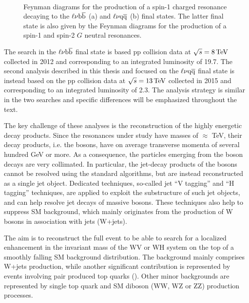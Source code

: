 \begin{figure}[!htb]
\centering
{}
\\
\caption{Feynman diagrams for the production of a spin-1 charged resonance \Wpr decaying to the $\ell\nu{\mathrm{b}\overline{\mathrm{b}}}$ (a) and $\ell\nu\mathrm{q}\overline{\mathrm{q}}$ (b) final states.
The latter final state is also given by the Feynman diagrams for the production of a spin-1 \Zpr and spin-2 $G$ neutral resonances.}
\label{fig:FDsignals}
\end{figure}

The search in the $\ell\nu{\mathrm{b}\overline{\mathrm{b}}}$ final state is based pp collision data at $\sqrt{s} = 8\,\text{Te\hspace{-.08em}V}$ collected in 2012 and corresponding to an integrated luminosity of 19.7\fbinv.
The second analysis described in this thesis and focused on the $\ell\nu\mathrm{q}\overline{\mathrm{q}}$ final state is instead based on the pp collision data at $\sqrt{s} = 13\,\text{Te\hspace{-.08em}V}$ collected in 2015 and corresponding to an integrated luminosity of 2.3\fbinv.
The analysis strategy is similar in the two searches and specific differences will be emphasized throughout the text.

The key challenge of these analyses is the reconstruction of the highly energetic decay products.
Since the resonances under study have masses of $\approx$ TeV, their decay products, i.e. the bosons,
have on average transverse momenta of several hundred GeV or more.
As a consequence, the particles emerging from the boson decays are very collimated.
In particular, the jet-decay products of the bosons cannot be resolved using the standard algorithms,
but are instead reconstructed as a single jet object. Dedicated techniques, so-called jet ``V tagging'' and ``H tagging'' techniques,
are applied to exploit the substructure of such jet objects, and can help resolve jet decays of massive bosons.
These techniques also help to suppress SM background, which mainly originates from the production of W bosons in association with jets (W+jets).

The aim is to reconstruct the full event to be able to search for a localized enhancement in the invariant mass of the WV or WH system
on the top of a smoothly falling SM background distribution.
The background mainly comprises W+jets production, while another significant contribution is represented by 
events involving pair produced top quarks (\ttbar).
Other minor backgrounds are represented by single top quark and SM diboson (WW, WZ or ZZ) production processes.


